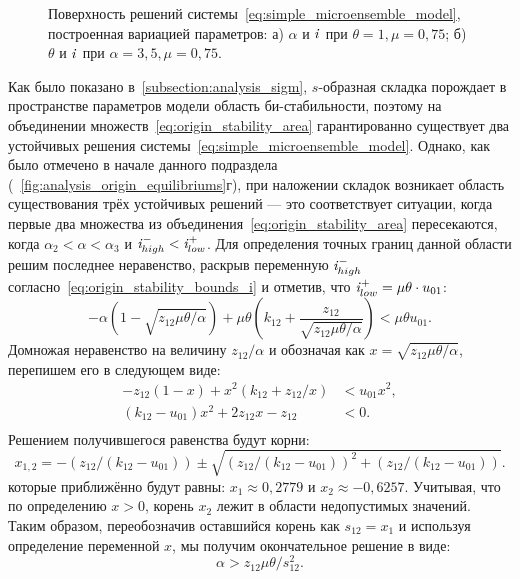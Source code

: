 \begin{figure}[t]
    \caption{Поверхность решений системы~\eqref{eq:simple_microensemble_model}, построенная вариацией параметров: а) $\alpha$ и $\mathit{i}$ при $\theta = 1, \mu = 0,75$; б) $\theta$ и $\mathit{i}$ при $\alpha = 3,5, \mu = 0,75$.}
    \label{fig:analysis_origin_solution_surface}
\end{figure}

Как было показано в~\autoref{subsection:analysis_sigm}, $s$-образная складка порождает в пространстве параметров модели область би-стабильности, поэтому на объединении множеств~\eqref{eq:origin_stability_area} гарантированно существует два устойчивых решения системы~\eqref{eq:simple_microensemble_model}. Однако, как было отмечено в начале данного подраздела (\seefigure~\ref{fig:analysis_origin_equilibriums}г), при наложении складок возникает область существования трёх устойчивых решений --- это соответствует ситуации, когда первые два множества из объединения~\eqref{eq:origin_stability_area} пересекаются, \ie когда $\alpha_{2} < \alpha < \alpha_{3}$ и $\mathit{i}_{high}^{-} < \mathit{i}_{low}^{+}$. Для определения точных границ данной области решим последнее неравенство, раскрыв переменную $\mathit{i}_{high}^{-}$ согласно~\eqref{eq:origin_stability_bounds_i} и отметив, что $\mathit{i}_{low}^{+} = \mu \theta \cdot u_{01}$:
\begin{equation}
    \nonumber
    -\alpha \left(1 - \sqrt{z_{12}\mu\theta/\alpha}\right) + \mu \theta \left(k_{12} + \dfrac{z_{12}}{\sqrt{z_{12}\mu\theta/\alpha}}\right) < \mu \theta u_{01}.
\end{equation}
Домножая неравенство на величину $z_{12} / \alpha$ и обозначая как $x = \sqrt{z_{12}\mu\theta/\alpha}$, перепишем его в следующем виде:
\begin{equation}
    \nonumber
    \begin{aligned}
        -z_{12} (1 - x) + x^{2} (k_{12} + z_{12} / x)   &< u_{01} x^{2}, \\
        (k_{12} - u_{01}) x^{2} + 2 z_{12} x - z_{12}   &< 0. \\
    \end{aligned}
\end{equation}
Решением получившегося равенства будут корни:
\begin{equation}
    \nonumber
    x_{1,2} = -\left(z_{12} / (k_{12} - u_{01})\right) \pm \sqrt{\left(z_{12} / (k_{12} - u_{01})\right)^{2} + \left(z_{12} / (k_{12} - u_{01})\right)}.
\end{equation}
которые приближённо будут равны: $x_{1} \approx 0,2779$ и $x_{2} \approx -0,6257$. Учитывая, что по определению $x > 0$, корень $x_{2}$ лежит в области недопустимых значений. Таким образом, переобозначив оставшийся корень как $s_{12} = x_{1}$ и используя определение переменной $x$, мы получим окончательное решение в виде:
\begin{equation}
    \nonumber
    \alpha > z_{12} \mu \theta / s_{12}^{2}.
\end{equation}

